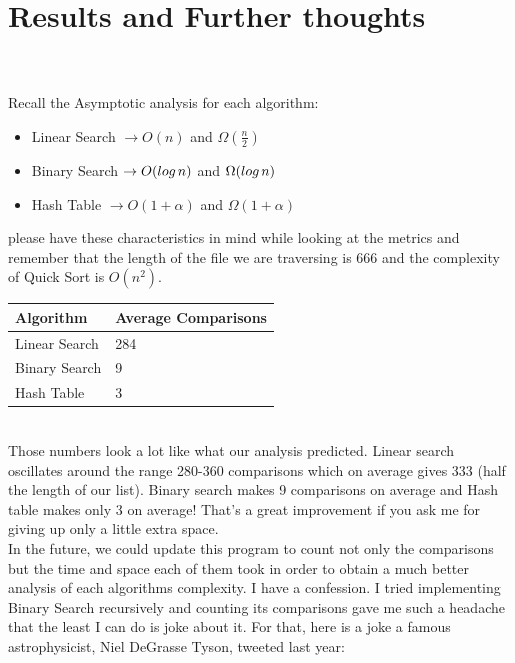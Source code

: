 \documentclass[letterpaper, 10pt]{article}
\begin{document}
\section{Results and Further thoughts}
\\
\\
Recall the Asymptotic analysis for each algorithm:
\begin{itemize}

    \item Linear Search $\rightarrow O(n)$ and $\Omega (\frac{n}{2})$
    
    \item Binary Search $\rightarrow O(log\hspace{0.5mm} n)$ and $\Omega (log\hspace{0.5mm} n)$
    
    \item Hash Table $\rightarrow O(1 + \alpha)$ and $\Omega (1 + \alpha)$
\end{itemize}
please have these characteristics in mind while looking at the metrics and remember that the length of the file we are traversing is 666 and the complexity of Quick Sort is $O(n^2)$.
\begin{table}[hdt]
    \centering
    \begin{tabular}{|l|l|}
        \hline
        Algorithm     & Average Comparisons \\ \hline
        Linear Search & 284                 \\ \hline
        Binary Search & 9                   \\ \hline
        Hash Table    & 3                   \\ \hline
    \end{tabular}
\end{table}
\\
Those numbers look a lot like what our analysis predicted. Linear search oscillates around the range 280-360 comparisons which on average gives 333 (half the length of our list). Binary search makes 9 comparisons on average and Hash table makes only 3 on average! That's a great improvement if you ask me for giving up only a little extra space.
\\
In the future, we could update this program to count not only the comparisons but the time and space each of them took in order to obtain a much better analysis of each algorithms complexity. I have a confession. I tried implementing Binary Search recursively and counting its comparisons gave me such a headache that the least I can do is joke about it. For that, here is a joke a famous astrophysicist, Niel DeGrasse Tyson, tweeted last year:
\end{document}
